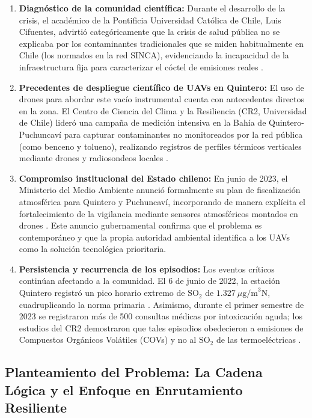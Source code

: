 \documentclass[letterpaper,12pt]{article}
\begin{document}
\begin{enumerate}
    \item \textbf{Diagnóstico de la comunidad científica:}
    Durante el desarrollo de la crisis, el académico de la Pontificia Universidad Católica de Chile, Luis Cifuentes, advirtió categóricamente que la crisis de salud pública no se explicaba por los contaminantes tradicionales que se miden habitualmente en Chile (los normados en la red SINCA), evidenciando la incapacidad de la infraestructura fija para caracterizar el cóctel de emisiones reales \cite{cifuentes}.

    \item \textbf{Precedentes de despliegue científico de UAVs en Quintero:}
    El uso de drones para abordar este vacío instrumental cuenta con antecedentes directos en la zona. El Centro de Ciencia del Clima y la Resiliencia (CR2, Universidad de Chile) lideró una campaña de medición intensiva en la Bahía de Quintero-Puchuncaví para capturar contaminantes no monitoreados por la red pública (como benceno y tolueno), realizando registros de perfiles térmicos verticales mediante drones y radiosondeos locales \cite{cr2_informe}.

    \item \textbf{Compromiso institucional del Estado chileno:}
    En junio de 2023, el Ministerio del Medio Ambiente anunció formalmente su plan de fiscalización atmosférica para Quintero y Puchuncaví, incorporando de manera explícita el fortalecimiento de la vigilancia mediante sensores atmosféricos montados en drones \cite{mma_drones}. Este anuncio gubernamental confirma que el problema es contemporáneo y que la propia autoridad ambiental identifica a los UAVs como la solución tecnológica prioritaria.

    \item \textbf{Persistencia y recurrencia de los episodios:}
    Los eventos críticos continúan afectando a la comunidad. El 6 de junio de 2022, la estación Quintero registró un pico horario extremo de $\text{SO}_2$ de $1.327\ \mu\text{g/m}^3\text{N}$, cuadruplicando la norma primaria \cite{sma_so2_2022}. Asimismo, durante el primer semestre de 2023 se registraron más de 500 consultas médicas por intoxicación aguda; los estudios del CR2 demostraron que tales episodios obedecieron a emisiones de Compuestos Orgánicos Volátiles (COVs) y no al $\text{SO}_2$ de las termoeléctricas \cite{eldesconcierto_2023}.
\end{enumerate}

\subsection{Planteamiento del Problema: La Cadena Lógica y el Enfoque en Enrutamiento Resiliente}
\label{subsec:problema}
\end{document}
